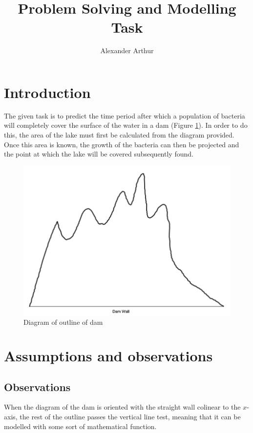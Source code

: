 \documentclass{article}
\title{Problem Solving and Modelling Task}
\author{Alexander Arthur}
\begin{document}
\maketitle
\setcounter{tocdepth}{1}
\tableofcontents

\section{Introduction}
    The given task is to predict the time period after which a population of bacteria will completely cover the surface of the water in a dam (Figure \ref{figDamOutline}). In order to do this, the area of the lake must first be calculated from the diagram provided. Once this area is known, the growth of the bacteria can then be projected and the point at which the lake will be covered subsequently found.

    \begin{figure}
        \centering
        \includegraphics[width = 12cm]{damDiagram.png}
        \caption{Diagram of outline of dam}
        \label{figDamOutline}
    \end{figure}



\section{Assumptions and observations}

    \subsection{Observations}

    When the diagram of the dam is oriented with the straight wall colinear to the $x$-axis, the rest of the outline passes the vertical line test, meaning that it can be modelled with some sort of mathematical function.
\end{document}
